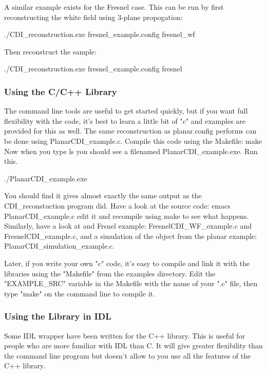 \documentclass[]{cxs-software}
\begin{document}
A similar example exists for the Fresnel case. This can be run by
first reconstructing the white field using 3-plane propogation:
\begin{myverbatim}
   ./CDI_reconstruction.exe fresnel_example.config fresnel_wf 
\end{myverbatim}
Then reconstruct the sample: 
\begin{myverbatim}
   ./CDI_reconstruction.exe fresnel_example.config fresnel
\end{myverbatim}

\subsubsection{Using the C/C++ Library}

The command line tools are useful to get started quickly, but if you
want full flexibility with the code, it's best to learn a little bit
of "c" and examples are provided for this as well. The same
reconstruction as planar.config performs can be done using
PlanarCDI\_example.c. Compile this code using the Makefile: make Now
when you type ls you should see a filenamed PlanarCDI\_example.exe. Run
this.
\begin{myverbatim}
./PlanarCDI_example.exe 
\end{myverbatim}
You should find it gives almost exactly the same output as the
CDI\_reconstuction program did. Have a look at the source code: emacs
PlanarCDI\_example.c edit it and recompile using make to see what
happens. Similarly, have a look at and Frsnel example:
FresnelCDI\_WF\_example.c and FresnelCDI\_example.c, and a simulation of
the object from the planar example: PlanarCDI\_simulation\_example.c.

Later, if you write your own "c" code, it's easy to compile and link
it with the libraries using the "Makefile" from the examples
directory. Edit the "EXAMPLE\_SRC" variable in the Makefile with the
name of your ".c" file, then type "make" on the command line to
compile it.

\subsubsection{Using the Library in IDL}

Some IDL wrapper have been written for the C++ library. This is useful
for people who are more familiar with IDL than C. It will give greater
flexibility than the command line program but doesn't allow to you use
all the features of the C++ library.
\end{document}
